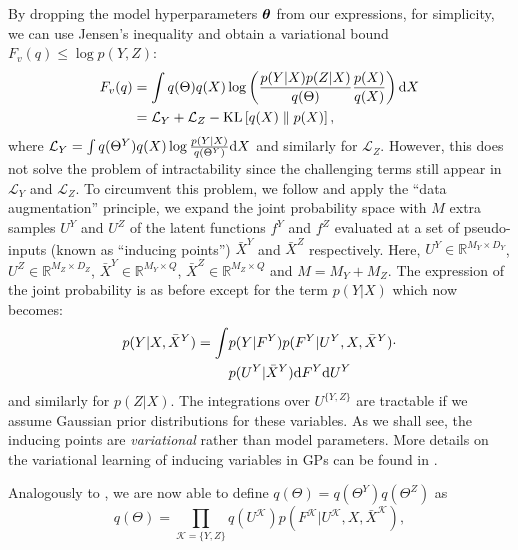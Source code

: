  By dropping the model hyperparameters $\boldsymbol \theta$ from our expressions, 
  for simplicity, we can use Jensen's inequality and obtain a variational
bound $F_v(q) \leq \log p(Y,Z)$:
\begin{align}
F_v(q) & = \int q(\Theta) q(X) \log \left( \frac{p(Y|X)p(Z|X)}{q(\Theta)}\frac{p(X)}{q(X)} \right) \text{d} X \nonumber \\
      & = \mathcal{L}_Y + \mathcal{L}_Z - \text{KL} \left[ q(X) \parallel p(X)\right], \label{eq:bound}
\end{align}
where %
$\mathcal{L}_Y = \int q(\Theta^Y) q(X) \log
\frac{p(Y|X)}{q(\Theta^Y)} \text{d} X$ and similarly for $\mathcal{L}_Z$.
However, this does not solve the problem of intractability since the
challenging terms still appear in $\mathcal{L}_Y$ and $\mathcal{L}_Z$.
To circumvent this problem, we follow \citet{Titsias:bayesGPLVM10} and
apply the ``data augmentation'' principle, \ie we expand the joint
probability space with $M$ extra samples $U^Y$ and $U^Z$ of the latent
functions $f^Y$ and $f^Z$ evaluated at a set of pseudo-inputs (known
as ``inducing points'') $\bar{X}^Y$ and $\bar{X}^Z$
respectively. Here, $U^Y \in \mathbb{R}^{M_Y \times D_Y}$, $U^Z \in
\mathbb{R}^{M_Z \times D_Z}$, $\bar{X}^Y \in \mathbb{R}^{M_Y \times
  Q}$, $\bar{X}^Z \in \mathbb{R}^{M_Z \times Q}$ and $M = M_Y+M_Z$.
The expression of the joint probability is as before except for the
term $p(Y|X)$ which now becomes:
 \begin{align}
  p(Y|X, \bar{X}^Y) = \int & p(Y|F^Y)p(F^Y|U^Y,X, \bar{X}^Y) \cdot \nonumber \\
  				           & p(U^Y|\bar{X}^Y) \text{d} F^Y \text{d} U^Y \label{eq:pYXXbar}
  \end{align}
%
and similarly for $p(Z|X)$. 
The integrations over $U^{\{Y,Z\}}$ are tractable if we assume 
Gaussian prior distributions for these variables.
%
As we shall see, the inducing points are \emph{variational} rather than
model parameters.  More details on the variational learning of
inducing variables in GPs can be found in
\citet{Titsias:variational09}.
%
\par Analogously to \citet{Titsias:bayesGPLVM10}, we are now able to
define $q(\Theta) =  q(\Theta^Y) q(\Theta^Z) $ as
\begin{equation}
\label{qTheta}
q(\Theta) = \prod_{\mathcal{K}=\{Y,Z\}} q(U^\mathcal{K}) p(F^\mathcal{K}|U^\mathcal{K},X,\bar{X}^\mathcal{K}),
\end{equation} 
